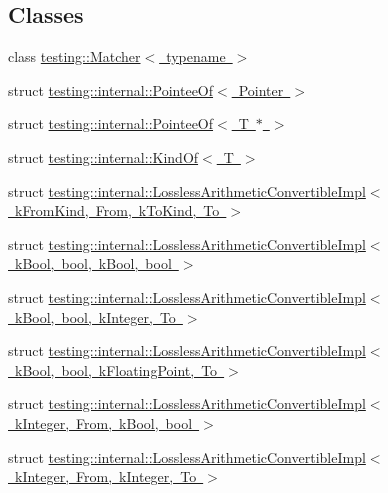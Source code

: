 \subsection*{Classes}
\begin{DoxyCompactItemize}
\item 
class \mbox{\hyperlink{classtesting_1_1_matcher}{testing\+::\+Matcher$<$ typename $>$}}
\item 
struct \mbox{\hyperlink{structtesting_1_1internal_1_1_pointee_of}{testing\+::internal\+::\+Pointee\+Of$<$ Pointer $>$}}
\item 
struct \mbox{\hyperlink{structtesting_1_1internal_1_1_pointee_of_3_01_t_01_5_01_4}{testing\+::internal\+::\+Pointee\+Of$<$ T $\ast$ $>$}}
\item 
struct \mbox{\hyperlink{structtesting_1_1internal_1_1_kind_of}{testing\+::internal\+::\+Kind\+Of$<$ T $>$}}
\item 
struct \mbox{\hyperlink{structtesting_1_1internal_1_1_lossless_arithmetic_convertible_impl}{testing\+::internal\+::\+Lossless\+Arithmetic\+Convertible\+Impl$<$ k\+From\+Kind, From, k\+To\+Kind, To $>$}}
\item 
struct \mbox{\hyperlink{structtesting_1_1internal_1_1_lossless_arithmetic_convertible_impl_3_01k_bool_00_01bool_00_01k_bool_00_01bool_01_4}{testing\+::internal\+::\+Lossless\+Arithmetic\+Convertible\+Impl$<$ k\+Bool, bool, k\+Bool, bool $>$}}
\item 
struct \mbox{\hyperlink{structtesting_1_1internal_1_1_lossless_arithmetic_convertible_impl_3_01k_bool_00_01bool_00_01k_integer_00_01_to_01_4}{testing\+::internal\+::\+Lossless\+Arithmetic\+Convertible\+Impl$<$ k\+Bool, bool, k\+Integer, To $>$}}
\item 
struct \mbox{\hyperlink{structtesting_1_1internal_1_1_lossless_arithmetic_convertible_impl_3_01k_bool_00_01bool_00_01k_floating_point_00_01_to_01_4}{testing\+::internal\+::\+Lossless\+Arithmetic\+Convertible\+Impl$<$ k\+Bool, bool, k\+Floating\+Point, To $>$}}
\item 
struct \mbox{\hyperlink{structtesting_1_1internal_1_1_lossless_arithmetic_convertible_impl_3_01k_integer_00_01_from_00_01k_bool_00_01bool_01_4}{testing\+::internal\+::\+Lossless\+Arithmetic\+Convertible\+Impl$<$ k\+Integer, From, k\+Bool, bool $>$}}
\item 
struct \mbox{\hyperlink{structtesting_1_1internal_1_1_lossless_arithmetic_convertible_impl_3_01k_integer_00_01_from_00_01k_integer_00_01_to_01_4}{testing\+::internal\+::\+Lossless\+Arithmetic\+Convertible\+Impl$<$ k\+Integer, From, k\+Integer, To $>$}}

\end{DoxyCompactItemize}
